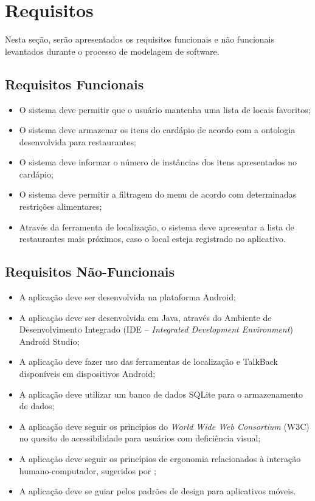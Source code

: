 \chapter{\label{chap:requi}Requisitos}
Nesta seção, serão apresentados os requisitos funcionais e não funcionais levantados durante o processo de modelagem de software.

\section{Requisitos Funcionais}
\begin{itemize}
    \item O sistema deve permitir que o usuário mantenha uma lista de locais favoritos;
    \item O sistema deve armazenar os itens do cardápio de acordo com a ontologia desenvolvida para restaurantes;
    \item O sistema deve informar o número de instâncias dos itens apresentados no cardápio;
    \item O sistema deve permitir a filtragem do menu de acordo com determinadas restrições alimentares;
    \item Através da ferramenta de localização, o sistema deve apresentar a lista de restaurantes mais próximos, caso o local esteja registrado no aplicativo.
\end{itemize}

\section{Requisitos Não-Funcionais}
\begin{itemize}
    \item A aplicação deve ser desenvolvida na plataforma Android;
    \item A aplicação deve ser desenvolvida em Java, através do Ambiente de Desenvolvimento Integrado (IDE -- \emph{Integrated Development Environment}) Android Studio;
    \item A aplicação deve fazer uso das ferramentas de localização e TalkBack disponíveis em dispositivos Android;
    \item A aplicação deve utilizar um banco de dados SQLite para o armazenamento de dados;
    \item A aplicação deve seguir os princípios do \emph{World Wide Web Consortium} (W3C) no quesito de acessibilidade para usuários com deficiência visual;
    \item A aplicação deve seguir os princípios de ergonomia relacionados à interação humano-computador, sugeridos por \cite{ERGO2015};
    \item A aplicação deve se guiar pelos padrões de design para aplicativos móveis.
\end{itemize}